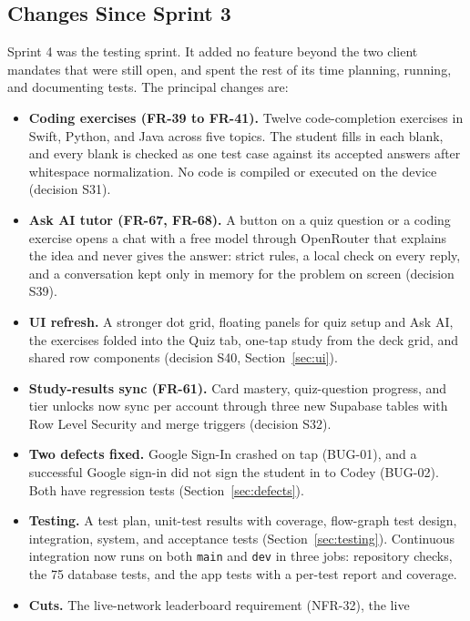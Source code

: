 \documentclass[12pt,letterpaper]{article}
\begin{document}
\subsection{Changes Since Sprint 3}
Sprint 4 was the testing sprint. It added no feature beyond the two client mandates
that were still open, and spent the rest of its time planning, running, and
documenting tests. The principal changes are:
\begin{itemize}
  \item \textbf{Coding exercises (FR-39 to FR-41).} Twelve code-completion exercises
        in Swift, Python, and Java across five topics. The student fills in each
        blank, and every blank is checked as one test case against its accepted
        answers after whitespace normalization. No code is compiled or executed on
        the device (decision S31).
  \item \textbf{Ask AI tutor (FR-67, FR-68).} A button on a quiz question or a coding
        exercise opens a chat with a free model through OpenRouter that explains the
        idea and never gives the answer: strict rules, a local check on every reply,
        and a conversation kept only in memory for the problem on screen
        (decision S39).
  \item \textbf{UI refresh.} A stronger dot grid, floating panels for quiz setup and
        Ask AI, the exercises folded into the Quiz tab, one-tap study from the deck
        grid, and shared row components (decision S40, Section~\ref{sec:ui}).
  \item \textbf{Study-results sync (FR-61).} Card mastery, quiz-question progress,
        and tier unlocks now sync per account through three new Supabase tables with
        Row Level Security and merge triggers (decision S32).
  \item \textbf{Two defects fixed.} Google Sign-In crashed on tap (BUG-01), and a
        successful Google sign-in did not sign the student in to Codey (BUG-02).
        Both have regression tests (Section~\ref{sec:defects}).
  \item \textbf{Testing.} A test plan, unit-test results with coverage, flow-graph
        test design, integration, system, and acceptance tests
        (Section~\ref{sec:testing}). Continuous integration now runs on both
        \texttt{main} and \texttt{dev} in three jobs: repository checks, the 75
        database tests, and the app tests with a per-test report and coverage.
  \item \textbf{Cuts.} The live-network leaderboard requirement (NFR-32), the live

\end{itemize}
\end{document}
